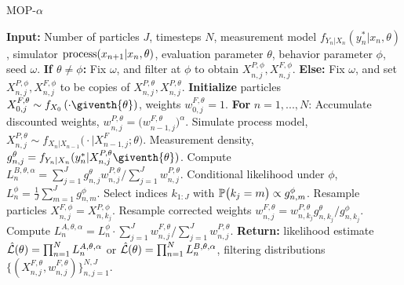 \documentclass[9pt,twocolumn,twoside]{pnas-new}
\begin{document}
\begin{algorithm}[H]
	\caption{MOP-$\alpha$}
    \label{alg:mop}
	     \textbf{Input:} Number of particles $J$, timesteps $N$, measurement model $f_{Y_n|X_n}(y_n^*|x_n, \theta)$, simulator $\text{process}(x_{n+1}|x_n, \theta)$, evaluation parameter $\theta$, behavior parameter $\phi$, seed $\omega$. \newline
        \textbf{If $\theta \neq \phi$:}
            Fix $\omega$, and filter at $\phi$ to obtain $X_{n,j}^{P,\phi}, X_{n,j}^{F,\phi}$. \newline
        \textbf{Else:} Fix $\omega$, and set $X_{n,j}^{P,\phi}, X_{n,j}^{F,\phi}$ to be copies of $X_{n,j}^{P,\theta}, X_{n,j}^{P,\theta}$. \newline
		\textbf{Initialize } particles ${X}_{0,j}^{F,\theta}\sim {f}_{{X}_{0}}\left(\cdot\giventh{\theta}\right)$, weights $w^{F,\theta}_{0,j}= 1$. \newline
		\textbf{For} $n=1,...,N$: \newline
            \hspace*{4mm} Accumulate discounted weights, $w_{n,j}^{P,\theta} = \big(w_{n-1,j}^{F,\theta}\big)^\alpha$.\newline
            \hspace*{4mm} Simulate process model,
            ${X}_{n,j}^{P,\theta}\sim {f}_{{X}_{n}|{X}_{n-1}}\big(\cdot|{X}_{n-1,j}^{F};{\theta}\big)$. \newline
            \hspace*{4mm} Measurement density,
            $g^{\theta}_{n,j}={f}_{{Y}_{n}|{X}_{n}}(y_{n}^{*}|{X}_{n,j}^{P,\theta}\giventh{\theta})$. \newline
            \hspace*{4mm} Compute $L_n^{B,\theta,\alpha} ={\sum_{j=1}^Jg^\theta_{n,j} w^{P,\theta}_{n,j}}/{\sum_{j=1}^J  w^{P,\theta}_{n,j}}$. \newline
            \hspace*{4mm} Conditional likelihood under $\phi$,
            $L_n^{\phi} = \frac{1}{J}\sum_{m=1}^{J}g^{\phi}_{n,m}$.\newline
            \hspace*{4mm} Select indices $k_{1:J}$ with $\mathbb{P}\big(k_{j}=m\big) \propto g^{\phi}_{n,m}$. \newline
            \hspace*{4mm} Resample particles ${X}_{n,j}^{F,\phi}={X}_{n,k_{j}}^{P,\phi}$. \newline
            \hspace*{4mm} Resample corrected weights
            $w_{n,j}^{F,\theta}= w^{P,\theta}_{n,k_j}  { g^{\theta}_{n,k_j}}/{ g^{\phi}_{n,k_j}}$.\newline
            \hspace*{4mm} Compute $ L_n^{A,\theta,\alpha} = L_n^\phi\cdot {\sum_{j=1}^J w^{F,\theta}_{n,j}}/{\sum_{j=1}^J  w^{P,\theta}_{n,j}}$.\newline
		\textbf{Return:} likelihood estimate $\hat{\mathcal{L}}(\theta) = \prod_{n=1}^N L_n^{A,\theta,\alpha}$ or $\hat{\mathcal{L}}(\theta) = \prod_{n=1}^N L_n^{B,\theta,\alpha}$, filtering distributions $\{(X_{n,j}^{F, \theta}, w^{F,\theta}_{n,j})\}_{n,j=1}^{N,J}.$
\end{algorithm}
\end{document}
